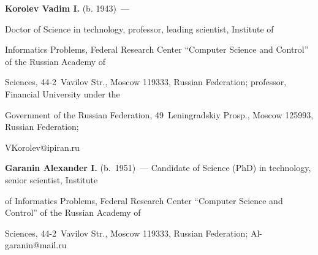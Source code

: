 \vspace*{3pt}



\noindent

\textbf{Korolev Vadim I.} (b. 1943)~---

 Doctor of Science in technology, professor, leading scientist, Institute of 

Informatics Problems, Federal Research Center ``Computer Science and Control'' of the Russian Academy of 

Sciences, 44-2~Vavilov Str., Moscow 119333, Russian Federation; professor, Financial University under the 

Government of the Russian Federation, 49~Leningradskiy Prosp., Moscow 125993, Russian Federation; 

\mbox{VKorolev@ipiran.ru}



\vspace*{3pt}



\noindent

\textbf{Garanin Alexander I.} (b.\ 1951)~--- Candidate of Science (PhD) in technology, senior scientist, Institute 

of Informatics Problems, Federal Research Center ``Computer Science and Control'' of the Russian Academy of 

Sciences, 44-2~Vavilov Str., Moscow 119333, Russian Federation; \mbox{Al-garanin@mail.ru}

  

\label{end\stat}



\renewcommand{\bibname}{\protect\rm Литература} 

